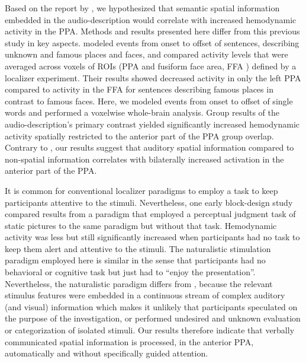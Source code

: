 \documentclass[english]{article}
\begin{document}
Based on the report by \cite{aziz2008modulation}, we hypothesized that semantic
spatial information embedded in the audio-description would correlate with
increased hemodynamic activity in the PPA.
%
Methods and results presented here differ from this previous study in key
aspects.
\cite{aziz2008modulation} modeled events from onset to offset of sentences,
describing unknown and famous places and faces, and compared activity levels
that were averaged across voxels of ROIs (PPA and fusiform face area, FFA
\citep{kanwisher1997ffa}) defined by a localizer experiment.
Their results showed decreased activity in only the left PPA
compared to activity in the FFA for sentences describing famous places in contrast
to famous faces.
Here, we modeled events from onset to offset of single words and performed a
voxelwise whole-brain analysis.
Group results of the audio-description's primary contrast yielded significantly
increased hemodynamic activity spatially restricted to the anterior part of the
PPA group overlap.
Contrary to \cite{aziz2008modulation}, our results suggest that auditory
spatial information compared to non-spatial information correlates with
bilaterally increased activation in the anterior part of the PPA.

It is common for conventional localizer paradigms to
employ a task to keep participants attentive to the stimuli.
Nevertheless, one early block-design study \citep{epstein1998ppa} compared
results from a paradigm that employed a perceptual judgment task of static
pictures to the same paradigm but without that task.
Hemodynamic activity was less but still significantly increased when
participants had no task to keep them alert and attentive to the stimuli.
The naturalistic stimulation paradigm employed here is similar in the sense that participants had no behavioral or
cognitive task \cite[e.g., forming a mental image of the stimuli;][]{ocraven2000mental} but just had to ``enjoy the presentation''.
Nevertheless, the naturalistic paradigm differs from \cite{epstein1998ppa},
because the relevant stimulus features were embedded in a continuous stream of complex
auditory (and visual) information which makes it unlikely that participants
speculated on the purpose of the investigation, or performed undesired and unknown evaluation or categorization of isolated stimuli.
Our results therefore indicate that verbally communicated spatial information
is processed, in the anterior PPA, automatically and without specifically
guided attention.
\end{document}
